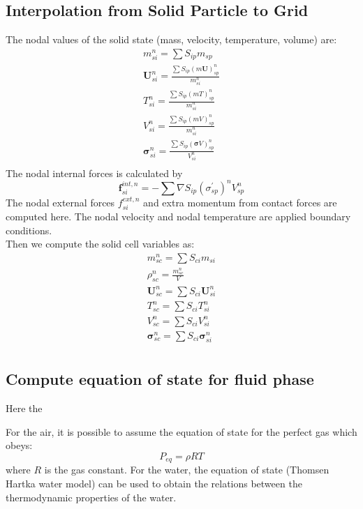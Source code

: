 \documentclass[preprint,12pt]{elsarticle}
\begin{document}
\subsection{\textsf{Interpolation from Solid Particle to Grid}}
%
%
The nodal values of the solid state (mass, velocity, temperature, volume) are:
%
%
\begin{equation}
\begin{gathered}
     m_{si}^n = \sum{S_{ip}m_{sp}}\\
     \pmb{U}_{si}^n = \frac {\sum{S_{ip} (m\pmb{U})_{sp}^n}}{m_{si}^n}\\
     T_{si}^n = \frac {\sum{S_{ip} (mT)_{sp}^n}}{m_{si}^n}\\
     V_{si}^n = \frac {\sum{S_{ip} (mV)_{sp}^n}}{m_{si}^n}\\
     \pmb{\sigma}_{si}^n = \frac {\sum{S_{ip} (\pmb{\sigma}V)_{sp}^n}}{V_{si}^n}\\
\end{gathered}
\end{equation}
%
%
The nodal internal forces is calculated by
%
%
\begin{equation}
     \pmb{f}_{si}^{int,n} = -\sum{\nabla S_{ip} (\sigma_{sp}^\prime)^n V_{sp}^n}
\end{equation}
%
%
The nodal external forces $f_{si}^{ext,n}$ and extra momentum from contact forces are computed here. The nodal velocity and nodal temperature are applied boundary conditions.\\
Then we compute the solid cell variables as:
%
%
\begin{equation}
\begin{gathered}
     m_{sc}^n = \sum{S_{ci}m_{si}}\\
   \rho_{sc}^n = \frac{m_{sc}^n}{V}\\  
     \pmb{U}_{sc}^n = \sum{S_{ci} \pmb{U}_{si}^n}\\
     T_{sc}^n = \sum{S_{ci} T_{si}^n}\\
     V_{sc}^n = \sum{S_{ci} V_{si}^n}\\
     \pmb{\sigma}_{sc}^n = \sum{S_{ci} \pmb{\sigma}_{si}^n}\\
\end{gathered}
\end{equation}
%
%
\subsection{\textsf{Compute equation of state for fluid phase}}
Here the 

For the air, it is possible to assume the equation of state for the perfect gas which obeys:
%
%
\begin{equation}
    P_{eq} = \rho R T
\end{equation}
%
%
where $R$ is the gas constant. For the water, the equation of state (Thomsen Hartka water model) can be used to obtain the relations between the thermodynamic properties of the water.\\
%
%
\end{document}
